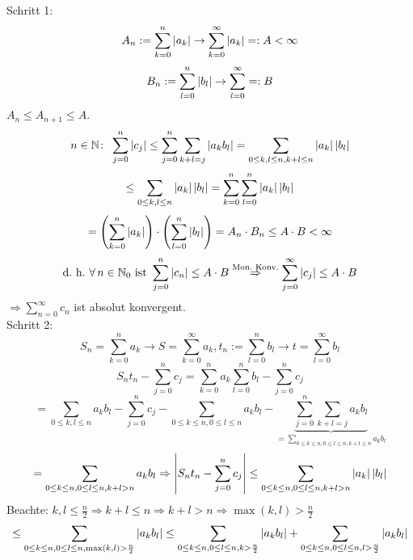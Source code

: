 \documentclass[../ana1.tex]{subfiles}
\begin{document}
\begin{prosa}
    \begin{center}
    \end{center}
\end{prosa}
\begin{bew}
    Schritt 1: 
    \[ A_n := \sum_{k=0}^n \left|a_k\right| \rightarrow \sum_{k=0}^\infty \left|a_k\right| =: A < \infty \]
    \[ B_n := \sum_{l=0}^n \left|b_l\right| \rightarrow \sum_{l=0}^\infty =: B \]
    \( A_n \leq A_{n+1} \leq A \).
    \[ n\in\mathbb{N} \colon \; \sum_{j=0}^n \left|c_j\right| \leq \sum_{j=0}^n \sum_{k+l=j} \left|a_k b_l\right| = \sum_{0\leq k, l\leq n, k+l\leq n} \left|a_k\right|\left|b_l\right| \]
    \[ \leq \sum_{0\leq k, l\leq n} \left|a_k\right| \left|b_l\right| = \sum_{k=0}^n \sum_{l=0}^n \left|a_k\right| \left|b_l\right| \]
    \[ = \left( \sum_{k=0}^n \left|a_k\right| \right) \cdot \left( \sum_{l=0}^n \left|b_l\right| \right) = A_n \cdot B_n \leq A \cdot B < \infty \]
    \[ \text{d.\ h.\ } \forall \, n\in\N_0 \text{ ist } \sum_{j=0}^n \abs{c_n} \leq A \cdot B \overset{\text{Mon.\ Konv.}}{\Rightarrow} \sum_{j=0}^\infty \abs{c_j} \leq A \cdot B \]
    \( \Rightarrow \sum_{n=0}^\infty c_n \) ist absolut konvergent. \\
    Schritt 2:
    \[ S_n = \sum_{k=0}^n a_k \rightarrow S = \sum_{k=0}^\infty a_k, t_n := \sum_{l=0}^n b_l \rightarrow t = \sum_{l=0}^\infty b_l \]
    \[ S_n t_n - \sum_{j=0}^n c_j = \sum_{k=0}^n a_k \sum_{l=0}^n b_l - \sum_{j=0}^n c_j \]
    \[ = \sum_{0\leq k, l\leq n} a_k b_l - \sum_{j=0}^n c_j - \sum_{0\leq k \leq n, 0\leq l \leq n} a_k b_l - \underbrace{\sum_{j=0}^n \sum_{k+l=j} a_k b_l}_{=\sum_{0\leq k \leq n, 0\leq l \leq n, k+l\leq n} a_k b_l} \]
    \[ = \sum_{0\leq k \leq n, 0\leq l \leq n, k+l>n} a_k b_l \Rightarrow \left| S_n t_n - \sum_{j=0}^n c_j \right| \leq \sum_{0\leq k\leq n, 0\leq l \leq n, k+l>n} \left|a_k\right|\left|b_l\right| \]
    Beachte: \( k,l \leq \frac{n}{2} \Rightarrow k + l \leq n \Rightarrow k + l > n \Rightarrow \max(k,l) > \frac{n}{2} \)
    \[ \leq \sum_{0\leq k\leq n, 0\leq l \leq n, \max(k,l) > \frac{n}{2}} \left|a_k b_l\right| \leq \sum_{0\leq k\leq n, 0\leq l \leq n, k > \frac{n}{2}} \left|a_k b_l\right| + \sum_{0\leq k\leq n, 0\leq l \leq n, l>\frac{n}{2}} \left|a_k b_l\right| \]

\end{bew}
\end{document}
